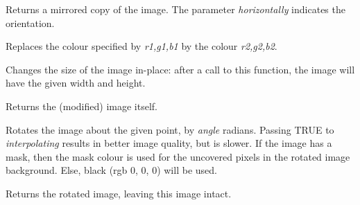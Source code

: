 
\label{wximagemirror}


Returns a mirrored copy of the image. The parameter {\it horizontally}
indicates the orientation.

\label{wximagereplace}


Replaces the colour specified by {\it r1,g1,b1} by the colour {\it r2,g2,b2}.

\label{wximagerescale}


Changes the size of the image in-place: after a call to this function, the
image will have the given width and height.

Returns the (modified) image itself.



\label{wximagerotate}


Rotates the image about the given point, by {\it angle} radians. Passing TRUE
to {\it interpolating} results in better image quality, but is slower. If the
image has a mask, then the mask colour is used for the uncovered pixels in the
rotated image background. Else, black (rgb 0, 0, 0) will be used.

Returns the rotated image, leaving this image intact.

\label{wximagerotate90}

